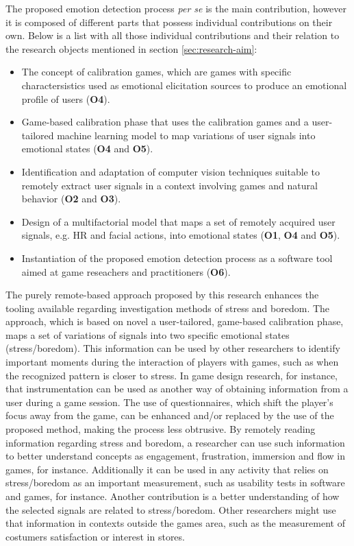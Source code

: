 The proposed emotion detection process \textit{per se} is the main contribution, however it is composed of different parts that possess individual contributions on their own. Below is a list with all those individual contributions and their relation to the research objects mentioned in section \ref{sec:research-aim}:

\begin{itemize}
  \item The concept of calibration games, which are games with specific charactersistics used as emotional elicitation sources to produce an emotional profile of users (\textbf{O4}).
  \item Game-based calibration phase that uses the calibration games and a user-tailored machine learning model to map variations of user signals into emotional states (\textbf{O4} and \textbf{O5}).
  \item Identification and adaptation of computer vision techniques suitable to remotely extract user signals in a context involving games and natural behavior (\textbf{O2} and \textbf{O3}).
  \item Design of a multifactorial model that maps a set of remotely acquired user signals, e.g. HR and facial actions, into emotional states (\textbf{O1}, \textbf{O4} and \textbf{O5}).
  \item Instantiation of the proposed emotion detection process as a software tool aimed at game reseachers and practitioners (\textbf{O6}).
\end{itemize}

The purely remote-based approach proposed by this research enhances the tooling available regarding investigation methods of stress and boredom. The approach, which is based on novel a user-tailored, game-based calibration phase, maps a set of variations of signals into two specific emotional states (stress/boredom). This information can be used by other researchers to identify important moments during the interaction of players with games, such as when the recognized pattern is closer to stress. In game design research, for instance, that instrumentation can be used as another way of obtaining information from a user during a game session. The use of questionnaires, which shift the player's focus away from the game, can be enhanced and/or replaced by the use of the proposed method, making the process less obtrusive. By remotely reading information regarding stress and boredom, a researcher can use such information to better understand concepts as engagement, frustration, immersion and flow in games, for instance. Additionally it can be used in any activity that relies on stress/boredom as an important measurement, such as usability tests in software and games, for instance. Another contribution is a better understanding of how the selected signals are related to stress/boredom. Other researchers might use that information in contexts outside the games area, such as the measurement of costumers satisfaction or interest in stores.

